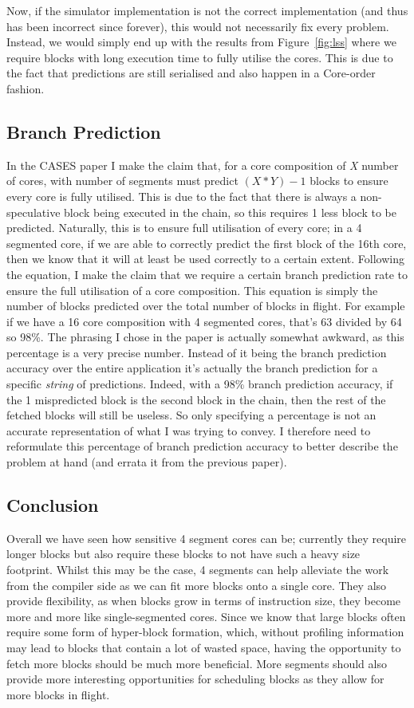 Now, if the simulator implementation is not the correct implementation (and thus has been incorrect since forever), this would not necessarily fix every problem.
Instead, we would simply end up with the results from Figure~\ref{fig:lss} where we require blocks with long execution time to fully utilise the cores.
This is due to the fact that predictions are still serialised and also happen in a Core-order fashion.
\subsection{Branch Prediction}
In the CASES paper I make the claim that, for a core composition of \textit{X} number of cores, with  number of segments must predict $(X*Y)-1$ blocks to ensure every core is fully utilised.
This is due to the fact that there is always a non-speculative block being executed in the chain, so this requires 1 less block to be predicted.
Naturally, this is to ensure full utilisation of every core; in a 4 segmented core, if we are able to correctly predict the first block of the 16th core, then we know that it will at least be used correctly to a certain extent.
Following the equation, I make the claim that we require a certain branch prediction rate to ensure the full utilisation of a core composition.
This equation is simply the number of blocks predicted over the total number of blocks in flight.
For example if we have a 16 core composition with 4 segmented cores, that's 63 divided by 64 so 98\%.
The phrasing I chose in the paper is actually somewhat awkward, as this percentage is a very precise number.
Instead of it being the branch prediction accuracy over the entire application it's actually the branch prediction for a specific \textit{string} of predictions.
Indeed, with a 98\% branch prediction accuracy, if the 1 mispredicted block is the second block in the chain, then the rest of the fetched blocks will still be useless.
So only specifying a percentage is not an accurate representation of what I was trying to convey.
I therefore need to reformulate this percentage of branch prediction accuracy to better describe the problem at hand (and errata it from the previous paper).

\subsection{Conclusion}

Overall we have seen how sensitive 4 segment cores can be; currently they require longer blocks but also require these blocks to not have such a heavy size footprint.
Whilst this may be the case, 4 segments can help alleviate the work from the compiler side as we can fit more blocks onto a single core.
They also provide flexibility, as when blocks grow in terms of instruction size, they become more and more like single-segmented cores.
Since we know that large blocks often require some form of hyper-block formation, which, without profiling information may lead to blocks that contain a lot of wasted space, having the opportunity to fetch more blocks should be much more beneficial.
More segments should also provide more interesting opportunities for scheduling blocks as they allow for more blocks in flight.

